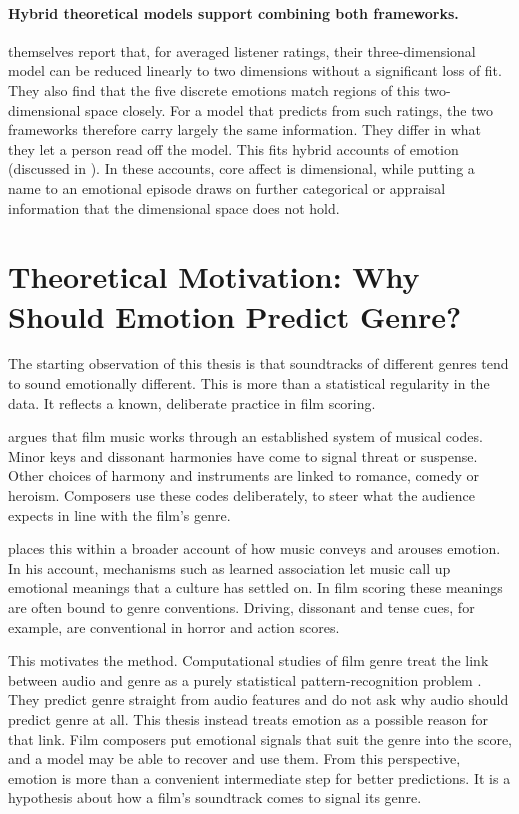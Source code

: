 \paragraph{Hybrid theoretical models support combining both frameworks.} \citet{eerola2011comparison} themselves report that, for averaged listener ratings, their three-dimensional model can be reduced linearly to two dimensions without a significant loss of fit. They also find that the five discrete emotions match regions of this two-dimensional space closely. For a model that predicts from such ratings, the two frameworks therefore carry largely the same information. They differ in what they let a person read off the model. This fits hybrid accounts of emotion (discussed in \citealp{eerola2011comparison}). In these accounts, core affect is dimensional, while putting a name to an emotional episode draws on further categorical or appraisal information that the dimensional space does not hold.

\section{Theoretical Motivation: Why Should Emotion Predict Genre?}
\label{sec:fund_motivation_theory}

The starting observation of this thesis is that soundtracks of different genres tend to sound emotionally different. This is more than a statistical regularity in the data. It reflects a known, deliberate practice in film scoring.

\citet{gorbman1987unheard} argues that film music works through an established system of musical codes. Minor keys and dissonant harmonies have come to signal threat or suspense. Other choices of harmony and instruments are linked to romance, comedy or heroism. Composers use these codes deliberately, to steer what the audience expects in line with the film's genre.

\citet{juslin2013everyday} places this within a broader account of how music conveys and arouses emotion. In his account, mechanisms such as learned association let music call up emotional meanings that a culture has settled on. In film scoring these meanings are often bound to genre conventions. Driving, dissonant and tense cues, for example, are conventional in horror and action scores.

This motivates the method. Computational studies of film genre treat the link between audio and genre as a purely statistical pattern-recognition problem \citep{austin2010characterization,ma2021computational,mangolin2020multimodal}. They predict genre straight from audio features and do not ask why audio should predict genre at all. This thesis instead treats emotion as a possible reason for that link. Film composers put emotional signals that suit the genre into the score, and a model may be able to recover and use them. From this perspective, emotion is more than a convenient intermediate step for better predictions. It is a hypothesis about how a film's soundtrack comes to signal its genre.

